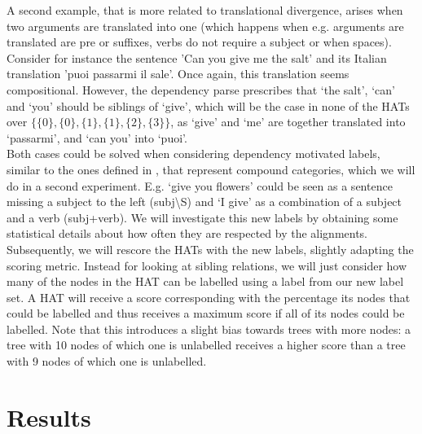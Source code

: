 \documentclass{report}
\theoremstyle{definition}
\theoremstyle{plain}
\begin{document}
A second example, that is more related to translational divergence, arises when two arguments are translated into one (which happens when e.g. arguments are translated are pre or suffixes, verbs do not require a subject or when spaces). Consider for instance the sentence 'Can you give me the salt' and its Italian translation 'puoi passarmi il sale'. Once again, this translation seems compositional. However, the dependency parse prescribes that `the salt', `can' and `you' should be siblings of `give', which will be the case in none of the HATs over $\{\{0\},\{0\},\{1\},\{1\},\{2\},\{3\}\}$, as `give' and `me' are together translated into `passarmi', and `can you' into `puoi'.\\
Both cases could be solved when considering dependency motivated labels, similar to the ones defined in \cite{zollmann2006syntax}, that represent compound categories, which we will do in a second experiment. E.g. `give you flowers' could be seen as a sentence missing a subject to the left (subj\textbackslash S) and `I give' as a combination of a subject and a verb (subj+verb). We will investigate this new labels by obtaining some statistical details about how often they are respected by the alignments. Subsequently, we will rescore the HATs with the new labels, slightly adapting the scoring metric. Instead for looking at sibling relations, we will just consider how many of the nodes in the HAT can be labelled using a label from our new label set. A HAT will receive a score corresponding with the percentage its nodes that could be labelled and thus receives a maximum score if all of its nodes could be labelled. Note that this introduces a slight bias towards trees with more nodes: a tree with 10 nodes of which one is unlabelled receives a higher score than a tree with 9 nodes of which one is unlabelled. %




%
%


\chapter{Results}
\end{document}
